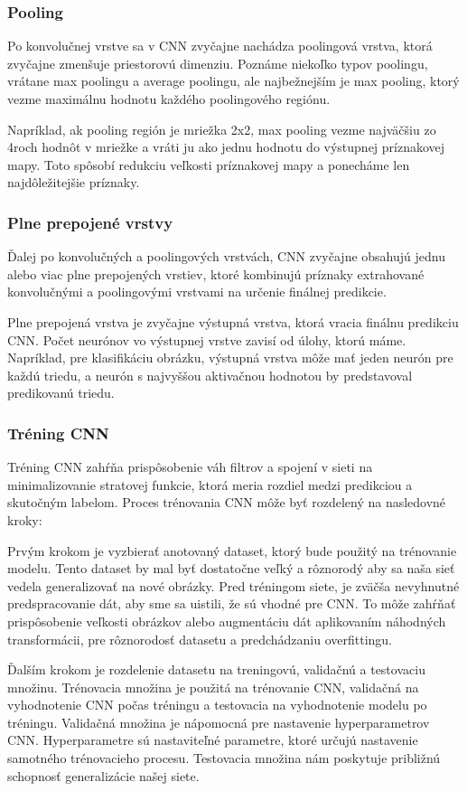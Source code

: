 \subsubsection{Pooling}
Po konvolučnej vrstve sa v CNN zvyčajne nachádza poolingová vrstva, ktorá zvyčajne zmenšuje priestorovú dimenziu. Poznáme niekoľko typov poolingu, vrátane max poolingu a average poolingu, ale najbežnejším je max pooling, ktorý vezme maximálnu hodnotu každého poolingového regiónu. 

Napríklad, ak pooling región je mriežka 2x2, max pooling vezme najväčšiu zo 4roch hodnôt v mriežke a vráti ju ako jednu hodnotu do výstupnej príznakovej mapy. Toto spôsobí redukciu veľkosti príznakovej mapy a ponecháme len najdôležitejšie príznaky. 

\subsubsection{Plne prepojené vrstvy}
Ďalej po konvolučných a poolingových vrstvách, CNN zvyčajne obsahujú jednu alebo viac plne prepojených vrstiev, ktoré kombinujú príznaky extrahované konvolučnými a poolingovými vrstvami na určenie finálnej predikcie. 

Plne prepojená vrstva je zvyčajne výstupná vrstva, ktorá vracia finálnu predikciu CNN. Počet neurónov vo výstupnej vrstve zavisí od úlohy, ktorú máme. Napríklad, pre klasifikáciu obrázku, výstupná vrstva môže mať jeden neurón pre každú triedu, a neurón s najvyššou aktivačnou hodnotou by predstavoval predikovanú triedu. 

\subsubsection{Tréning CNN}
Tréning CNN zahŕňa prispôsobenie váh filtrov a spojení v sieti na minimalizovanie stratovej funkcie, ktorá meria rozdiel medzi predikciou a skutočným labelom. Proces trénovania CNN môže byť rozdelený na nasledovné kroky:

Prvým krokom je vyzbierať anotovaný dataset, ktorý bude použitý na trénovanie modelu. Tento dataset by mal byť dostatočne veľký a rôznorodý aby sa naša sieť vedela generalizovať na nové obrázky. Pred tréningom siete, je zväčša nevyhnutné predspracovanie dát, aby sme sa uistili, že sú vhodné pre CNN. To môže zahŕňať prispôsobenie veľkosti obrázkov alebo augmentáciu dát aplikovaním náhodných transformácii, pre rôznorodosť datasetu a predchádzaniu overfittingu. 

Ďalším krokom je rozdelenie datasetu na treningovú, validačnú a testovaciu množinu. Trénovacia množina je použitá na trénovanie CNN, validačná na vyhodnotenie CNN počas tréningu a testovacia na vyhodnotenie modelu po tréningu. Validačná množina je nápomocná pre nastavenie hyperparametrov CNN. Hyperparametre sú nastaviteľné parametre, ktoré určujú nastavenie samotného trénovacieho procesu. Testovacia množina nám poskytuje približnú schopnosť generalizácie našej siete. 

